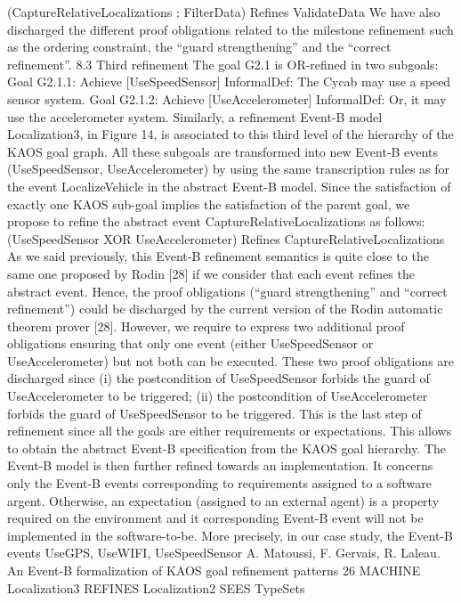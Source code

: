 (CaptureRelativeLocalizations ; FilterData) Refines ValidateData
We have also discharged the different proof obligations related to the milestone refinement
such as the ordering constraint, the “guard strengthening” and the “correct refinement”.
8.3 Third refinement
The goal G2.1 is OR-refined in two subgoals:
Goal G2.1.1: Achieve [UseSpeedSensor]
InformalDef: The Cycab may use a speed sensor system.
Goal G2.1.2: Achieve [UseAccelerometer]
InformalDef: Or, it may use the accelerometer system.
Similarly, a refinement Event-B model Localization3, in Figure 14, is associated to this
third level of the hierarchy of the KAOS goal graph. All these subgoals are transformed
into new Event-B events (UseSpeedSensor, UseAccelerometer) by using the same transcription rules as for the event LocalizeVehicle in the abstract Event-B model. Since the
satisfaction of exactly one KAOS sub-goal implies the satisfaction of the parent goal, we
propose to refine the abstract event CaptureRelativeLocalizations as follows:
(UseSpeedSensor XOR UseAccelerometer) Refines CaptureRelativeLocalizations
As we said previously, this Event-B refinement semantics is quite close to the same one
proposed by Rodin [28] if we consider that each event refines the abstract event. Hence,
the proof obligations (“guard strengthening” and “correct refinement”) could be discharged
by the current version of the Rodin automatic theorem prover [28]. However, we require
to express two additional proof obligations ensuring that only one event (either UseSpeedSensor or UseAccelerometer) but not both can be executed. These two proof obligations
are discharged since (i) the postcondition of UseSpeedSensor forbids the guard of UseAccelerometer to be triggered; (ii) the postcondition of UseAccelerometer forbids the
guard of UseSpeedSensor to be triggered.
This is the last step of refinement since all the goals are either requirements or expectations.
This allows to obtain the abstract Event-B specification from the KAOS goal hierarchy. The
Event-B model is then further refined towards an implementation. It concerns only the
Event-B events corresponding to requirements assigned to a software argent. Otherwise,
an expectation (assigned to an external agent) is a property required on the environment
and it corresponding Event-B event will not be implemented in the software-to-be. More
precisely, in our case study, the Event-B events UseGPS, UseWIFI, UseSpeedSensor
A. Matoussi, F. Gervais, R. Laleau. An Event-B formalization of KAOS goal refinement patterns 26
MACHINE Localization3
REFINES Localization2
SEES TypeSets
